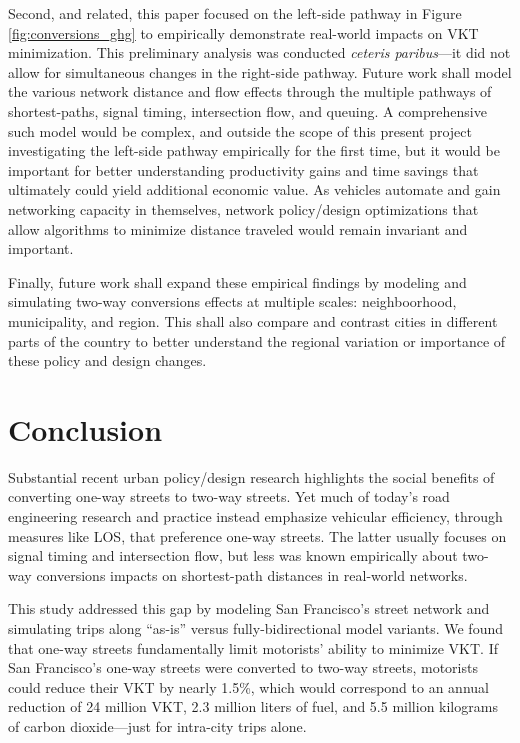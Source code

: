 \documentclass{trbunofficial}
\begin{document}
Second, and related, this paper focused on the left-side pathway in Figure \ref{fig:conversions_ghg} to empirically demonstrate real-world impacts on VKT minimization. This preliminary analysis was conducted \textit{ceteris paribus}---it did not allow for simultaneous changes in the right-side pathway. Future work shall model the various network distance and flow effects through the multiple pathways of shortest-paths, signal timing, intersection flow, and queuing. A comprehensive such model would be complex, and outside the scope of this present project investigating the left-side pathway empirically for the first time, but it would be important for better understanding productivity gains and time savings that ultimately could yield additional economic value. As vehicles automate and gain networking capacity in themselves, network policy/design optimizations that allow algorithms to minimize distance traveled would remain invariant and important.

Finally, future work shall expand these empirical findings by modeling and simulating two-way conversions effects at multiple scales: neighboorhood, municipality, and region. This shall also compare and contrast cities in different parts of the country to better understand the regional variation or importance of these policy and design changes.

\section{Conclusion}

Substantial recent urban policy/design research highlights the social benefits of converting one-way streets to two-way streets. Yet much of today's road engineering research and practice instead emphasize vehicular efficiency, through measures like LOS, that preference one-way streets. The latter usually focuses on signal timing and intersection flow, but less was known empirically about two-way conversions impacts on shortest-path distances in real-world networks.

This study addressed this gap by modeling San Francisco's street network and simulating trips along \enquote{as-is} versus fully-bidirectional model variants. We found that one-way streets fundamentally limit motorists' ability to minimize VKT. If San Francisco's one-way streets were converted to two-way streets, motorists could reduce their VKT by nearly 1.5\%, which would correspond to an annual reduction of 24 million VKT, 2.3 million liters of fuel, and 5.5 million kilograms of carbon dioxide---just for intra-city trips alone.
\end{document}
